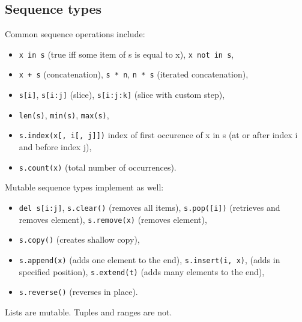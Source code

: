 \subsection{Sequence types}
Common sequence operations include:
\begin{itemize}
    \item
    \texttt{x in s} (true iff some item of s is equal to x),
    \texttt{x not in s},

    \item
    \texttt{x + s} (concatenation),
    \texttt{s * n},
    \texttt{n * s} (iterated concatenation),

    \item
    \texttt{s[i]},
    \texttt{s[i:j]} (slice),
    \texttt{s[i:j:k]} (slice with custom step),

    \item
    \texttt{len(s)},
    \texttt{min(s)},
    \texttt{max(s)},

    \item
    \texttt{s.index(x[, i[, j]])} index of first occurence of x in s (at or after index i and before index j),

    \item
    \texttt{s.count(x)} (total number of occurrences).
\end{itemize}

Mutable sequence types implement as well:
\begin{itemize}
    \item
    \texttt{del s[i:j]},
    \texttt{s.clear()} (removes all items),
    \texttt{s.pop([i])} (retrieves and removes element),
    \texttt{s.remove(x)} (removes element),

    \item
    \texttt{s.copy()} (creates shallow copy),

    \item
    \texttt{s.append(x)} (adds one element to the end),
    \texttt{s.insert(i, x)}, (adds in specified position),
    \texttt{s.extend(t)} (adds many elements to the end),

    \item
    \texttt{s.reverse()} (reverses in place).
\end{itemize}

Lists are mutable.
Tuples and ranges are not.



%